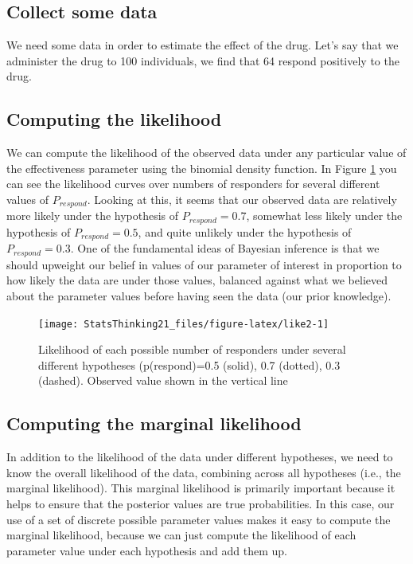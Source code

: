 \documentclass[12pt,]{book}
\theoremstyle{definition}
\theoremstyle{definition}
\theoremstyle{definition}
\theoremstyle{remark}
\begin{document}
\hypertarget{collect-some-data-1}{%
\subsection{Collect some data}\label{collect-some-data-1}}

We need some data in order to estimate the effect of the drug. Let's say that we administer the drug to 100 individuals, we find that 64 respond positively to the drug.

\hypertarget{computing-the-likelihood-1}{%
\subsection{Computing the likelihood}\label{computing-the-likelihood-1}}

We can compute the likelihood of the observed data under any particular value of the effectiveness parameter using the binomial density function. In Figure \ref{fig:like2} you can see the likelihood curves over numbers of responders for several different values of \(P_{respond}\). Looking at this, it seems that our observed data are relatively more likely under the hypothesis of \(P_{respond}=0.7\), somewhat less likely under the hypothesis of \(P_{respond}=0.5\), and quite unlikely under the hypothesis of \(P_{respond}=0.3\). One of the fundamental ideas of Bayesian inference is that we should upweight our belief in values of our parameter of interest in proportion to how likely the data are under those values, balanced against what we believed about the parameter values before having seen the data (our prior knowledge).

\begin{figure}
\texttt{[image: StatsThinking21\_files/figure-latex/like2-1]} \caption{Likelihood of each possible number of responders under several different hypotheses (p(respond)=0.5 (solid), 0.7 (dotted), 0.3 (dashed).  Observed value shown in the vertical line}\label{fig:like2}
\end{figure}

\hypertarget{computing-the-marginal-likelihood-1}{%
\subsection{Computing the marginal likelihood}\label{computing-the-marginal-likelihood-1}}

In addition to the likelihood of the data under different hypotheses, we need to know the overall likelihood of the data, combining across all hypotheses (i.e., the marginal likelihood). This marginal likelihood is primarily important because it helps to ensure that the posterior values are true probabilities. In this case, our use of a set of discrete possible parameter values makes it easy to compute the marginal likelihood, because we can just compute the likelihood of each parameter value under each hypothesis and add them up.
\end{document}
